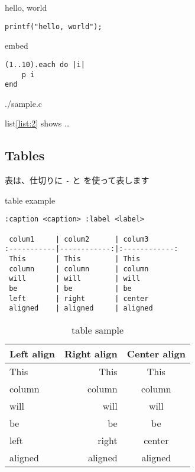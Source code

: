 \documentclass[a4j, titlepage]{jarticle}
\begin{document}
\begin{itembox}[c]{hello, world}
\begin{verbatim}
printf("hello, world");
\end{verbatim}
\end{itembox}

\begin{itembox}[c]{embed}
{\small

}
\end{itembox}

\begin{lstlisting}[caption=iterate ,label=list:1]
(1..10).each do |i|
	p i
end
\end{lstlisting}


{./sample.c}

list\ref{list:2} shows \ldots{}

\subsection{Tables}

表は、仕切りに {\tt -} と {\tt \textbar{}} を使って表します

\begin{itembox}[c]{table example}
\begin{verbatim}
:caption <caption> :label <label>

 colum1     | colum2      | colum3
:-----------|------------:|:------------:
 This       | This        | This         
 column     | column      | column       
 will       | will        | will         
 be         | be          | be           
 left       | right       | center       
 aligned    | aligned     | aligned   
\end{verbatim}
\end{itembox}

\begin{table}[h]
\centering
\caption{table sample }
\label{table:1}
\begin{tabular}{|l|r|c|}
\hline
Left align & Right align & Center align\\
\hline
This & This & This\\
column & column & column\\
will & will & will\\
be & be & be\\
left & right & center\\
aligned & aligned & aligned\\
\hline
\end{tabular}
\end{table}
\end{document}
